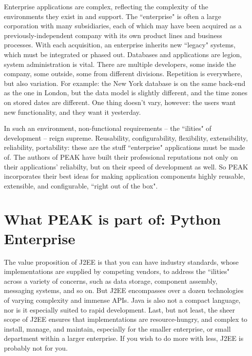 Enterprise applications are complex, reflecting the complexity of the
environments they exist in and support. The ``enterprise" is often a
large corporation with many subsidiaries, each of which may have been
acquired as a previously-independent company with its own product lines
and business processes. With each acquisition, an enterprise inherits
new ``legacy" systems, which must be integrated or phased out. Databases
and applications are legion, system administration is vital. There are
multiple developers, some inside the company, some outside, some from
different divisions. Repetition is everywhere, but also variation. For
example: the New York database is on the same back-end as the one in
London, but the data model is slightly different, and the time zones on
stored dates are different. One thing doesn't vary, however: the users
want new functionality, and they want it yesterday. 

In such an environment, non-functional requirements -- the ``ilities" of
development -- reign supreme. Reusability, configurability, flexibility,
extensibility, reliability, portability: these are the stuff
``enterprise" applications must be made of. The authors of PEAK have
built their professional reputations not only on their applications'
reliabilty, but on their speed of development as well. So PEAK
incorporates their best ideas for making application components highly
reusable, extensible, and configurable, ``right out of the box". 

















\section{What PEAK is part of: Python Enterprise} 

The value proposition of J2EE is that you can have industry standards,
whose implementations are supplied by competing vendors, to address
the ``ilities" across a variety of concerns, such as data storage,
component assembly, messaging systems, and so on.  But J2EE encompasses
over a dozen technologies of varying complexity and immense APIs.  Java
is also not a compact language, nor is it especially suited to rapid
development.  Last, but not least, the sheer scope of J2EE ensures that
implementations are resource-hungry, and complex to install, manage, and
maintain, especially for the smaller enterprise, or small department
within a larger enterprise.  If you wish to do more with less, J2EE is
probably not for you. 

